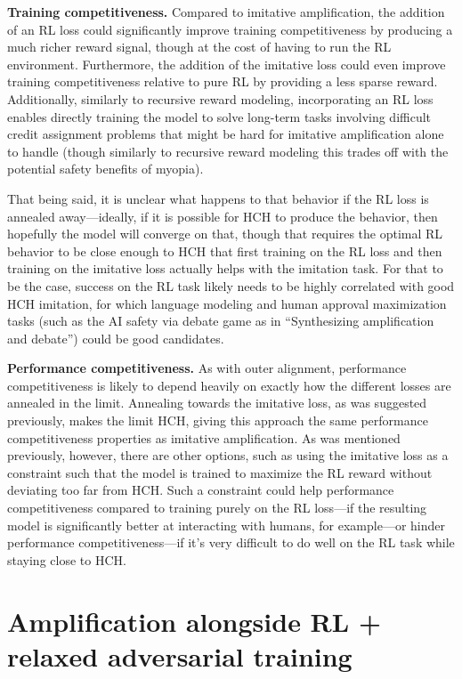\documentclass[
  onecolumn,
  natbib,
]{miri-tech-article}
\begin{document}
\textbf{Training competitiveness.} Compared to imitative amplification, the addition of an RL loss could significantly improve training competitiveness by producing a much richer reward signal, though at the cost of having to run the RL environment. Furthermore, the addition of the imitative loss could even improve training competitiveness relative to pure RL by providing a less sparse reward. Additionally, similarly to recursive reward modeling, incorporating an RL loss enables directly training the model to solve long-term tasks involving difficult credit assignment problems that might be hard for imitative amplification alone to handle (though similarly to recursive reward modeling this trades off with the potential safety benefits of myopia).

That being said, it is unclear what happens to that behavior if the RL loss is annealed away---ideally, if it is possible for HCH to produce the behavior, then hopefully the model will converge on that, though that requires the optimal RL behavior to be close enough to HCH that first training on the RL loss and then training on the imitative loss actually helps with the imitation task. For that to be the case, success on the RL task likely needs to be highly correlated with good HCH imitation, for which language modeling and human approval maximization tasks (such as the AI safety via debate game as in ``Synthesizing amplification and debate\cite{TODO: cite https://www.alignmentforum.org/posts/dJSD5RK6Qoidb3QY5/synthesizing-amplification-and-debate}'') could be good candidates.

\textbf{Performance competitiveness.} As with outer alignment, performance competitiveness is likely to depend heavily on exactly how the different losses are annealed in the limit. Annealing towards the imitative loss, as was suggested previously, makes the limit HCH, giving this approach the same performance competitiveness properties as imitative amplification. As was mentioned previously, however, there are other options, such as using the imitative loss as a constraint such that the model is trained to maximize the RL reward without deviating too far from HCH. Such a constraint could help performance competitiveness compared to training purely on the RL loss---if the resulting model is significantly better at interacting with humans, for example---or hinder performance competitiveness---if it's very difficult to do well on the RL task while staying close to HCH.

\section{Amplification alongside RL + relaxed adversarial training}
\label{sec:11}
\end{document}
